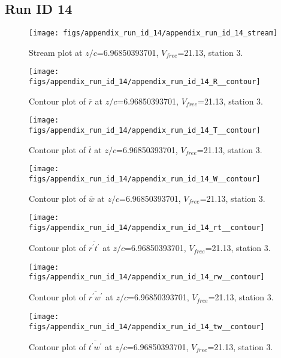 \subsection{Run ID 14}
\begin{figure}[H]
\centering
\texttt{[image: figs/appendix\_run\_id\_14/appendix\_run\_id\_14\_stream]}
\caption{Stream plot at $z/c$=6.96850393701, $V_{free}$=21.13, station 3.}
\label{fig:appendix_run_id_14_stream}
\end{figure}


\begin{figure}[H]
\centering
\texttt{[image: figs/appendix\_run\_id\_14/appendix\_run\_id\_14\_R\_\_contour]}
\caption{Contour plot of $\overline{r}$ at $z/c$=6.96850393701, $V_{free}$=21.13, station 3.}
\label{fig:appendix_run_id_14_R__contour}
\end{figure}


\begin{figure}[H]
\centering
\texttt{[image: figs/appendix\_run\_id\_14/appendix\_run\_id\_14\_T\_\_contour]}
\caption{Contour plot of $\overline{t}$ at $z/c$=6.96850393701, $V_{free}$=21.13, station 3.}
\label{fig:appendix_run_id_14_T__contour}
\end{figure}


\begin{figure}[H]
\centering
\texttt{[image: figs/appendix\_run\_id\_14/appendix\_run\_id\_14\_W\_\_contour]}
\caption{Contour plot of $\overline{w}$ at $z/c$=6.96850393701, $V_{free}$=21.13, station 3.}
\label{fig:appendix_run_id_14_W__contour}
\end{figure}


\begin{figure}[H]
\centering
\texttt{[image: figs/appendix\_run\_id\_14/appendix\_run\_id\_14\_rt\_\_contour]}
\caption{Contour plot of $\overline{r^\prime t^\prime}$ at $z/c$=6.96850393701, $V_{free}$=21.13, station 3.}
\label{fig:appendix_run_id_14_rt__contour}
\end{figure}


\begin{figure}[H]
\centering
\texttt{[image: figs/appendix\_run\_id\_14/appendix\_run\_id\_14\_rw\_\_contour]}
\caption{Contour plot of $\overline{r^\prime w^\prime}$ at $z/c$=6.96850393701, $V_{free}$=21.13, station 3.}
\label{fig:appendix_run_id_14_rw__contour}
\end{figure}


\begin{figure}[H]
\centering
\texttt{[image: figs/appendix\_run\_id\_14/appendix\_run\_id\_14\_tw\_\_contour]}
\caption{Contour plot of $\overline{t^\prime w^\prime}$ at $z/c$=6.96850393701, $V_{free}$=21.13, station 3.}
\label{fig:appendix_run_id_14_tw__contour}
\end{figure}


